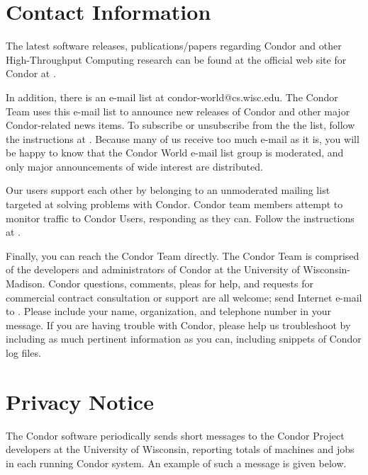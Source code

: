 \section{\label{contact-info}Contact Information}

The latest software releases, publications/papers regarding Condor and other 
High-Throughput Computing
research can be found at the official web site for Condor at  
.

In addition, there is an e-mail list at condor-world@cs.wisc.edu.
The Condor Team uses this e-mail list to announce new releases of
Condor and other major Condor-related news items.
To subscribe or unsubscribe from the the list, follow the instructions at  
.
Because many of us receive 
too much e-mail as it is, you will be happy to know that the
Condor World e-mail list group is 
moderated, and only major announcements of wide interest are distributed.

Our users support each other by belonging to an unmoderated mailing
list targeted at solving problems with Condor.
Condor team members attempt to monitor traffic to Condor Users,
responding as they can. 
Follow the instructions at
.

Finally, you can reach the Condor Team directly.
The Condor Team is comprised of the 
developers and administrators of Condor at the University of Wisconsin-Madison.
Condor questions, comments, pleas for help,
and requests for commercial contract consultation or support 
are all welcome;
send Internet e-mail to
.
Please include your name, organization, and telephone number in your message.
If you are having trouble with Condor,
please help us troubleshoot by including as much pertinent information
as you can, including snippets of Condor log files. 

\section{\label{privacy}Privacy Notice}

%
%

The Condor software periodically sends short messages
to the Condor Project developers at the University of Wisconsin,
reporting totals of machines and jobs in each running Condor system.
An example of such a message is given below.

